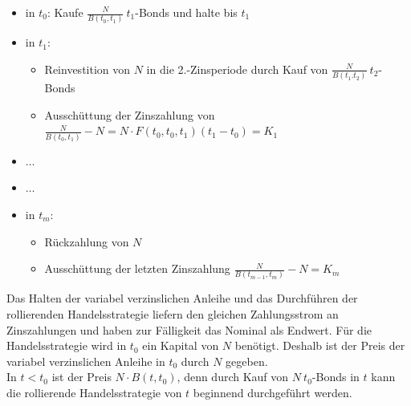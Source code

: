 \begin{itemize}
	\item in $t_0$: Kaufe $\frac{N}{B(t_0,t_1)}~t_1$-Bonds und halte bis $t_1$
	\item in $t_1$: 
	\begin{itemize}
		\item Reinvestition von $N$ in die 2.-Zinsperiode durch Kauf von $\frac{N}{B(t_1.t_2)}~t_2$-Bonds
		\item Ausschüttung der Zinszahlung von $\frac{N}{B(t_0,t_1)}-N=N\cdot F(t_0,t_0,t_1)(t_1-t_0)=K_1$
	\end{itemize}
	\item $\dots$
	\item$\dots$
	\item in $t_m$:
	\begin{itemize}
		\item Rückzahlung von $N$
		\item Ausschüttung der letzten Zinszahlung $\frac{N}{B(t_{m-1},t_m)}-N=K_m$
	\end{itemize}
\end{itemize}
Das Halten der variabel verzinslichen Anleihe und das Durchführen der rollierenden Handelsstrategie liefern den gleichen Zahlungsstrom an Zinszahlungen und haben zur Fälligkeit das Nominal als Endwert. 
Für die Handelsstrategie wird in $t_0$ ein Kapital von $N$ benötigt. 
Deshalb ist der Preis der variabel verzinslichen Anleihe in $t_0$ durch $N$ gegeben. \\
In $t<t_0$ ist der Preis $N\cdot B(t,t_0)$, denn durch Kauf von $N~t_0$-Bonds in $t$ kann die rollierende Handelsstrategie von $t$ beginnend durchgeführt werden.

